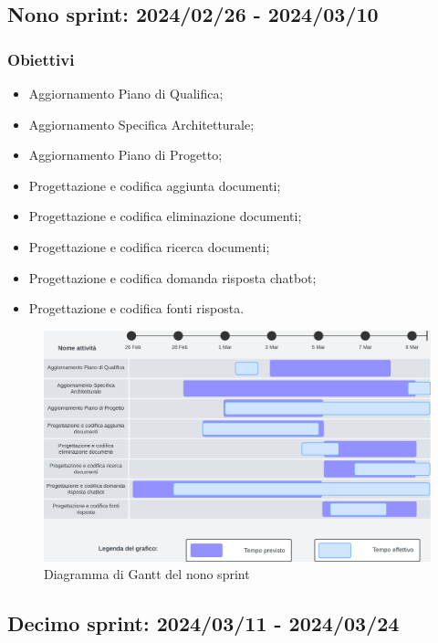 \subsection{Nono sprint: 2024/02/26 - 2024/03/10}
\subsubsection{Obiettivi}
\begin{itemize}
    \item Aggiornamento Piano di Qualifica;
    \item Aggiornamento Specifica Architetturale;
    \item Aggiornamento Piano di Progetto;
    \item Progettazione e codifica aggiunta documenti;
    \item Progettazione e codifica eliminazione documenti;
    \item Progettazione e codifica ricerca documenti;
    \item Progettazione e codifica domanda risposta chatbot;
    \item Progettazione e codifica fonti risposta.
\end{itemize}

\begin{figure}[h!]
    \centering
    \includegraphics[width=\textwidth]{Roadmap9sprint.png}
    \caption{Diagramma di Gantt del nono sprint}
    \label{fig:roadmaps9s} 
\end{figure}

\subsection{Decimo sprint: 2024/03/11 - 2024/03/24}
